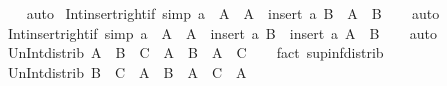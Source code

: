 \begin{isabellebody}
%
\isadelimproof
\ \ %
\endisadelimproof
%
\isatagproof
{}\isamarkupfalse%
\ auto%
\endisatagproof
{\isafoldproof}%
%
\isadelimproof
\isanewline
%
\endisadelimproof
\isanewline
{}\isamarkupfalse%
\ Int{\isacharunderscore}{\kern0pt}insert{\isacharunderscore}{\kern0pt}right{\isacharunderscore}{\kern0pt}if{}\ {\isacharbrackleft}{\kern0pt}simp{\isacharbrackright}{\kern0pt}{\isacharcolon}{\kern0pt}\ {\isachardoublequoteopen}a\ {\isasymnotin}\ A\ {\isasymLongrightarrow}\ A\ {\isasyminter}\ {\isacharparenleft}{\kern0pt}insert\ a\ B{\isacharparenright}{\kern0pt}\ {\isacharequal}{\kern0pt}\ A\ {\isasyminter}\ B{\isachardoublequoteclose}\isanewline
%
\isadelimproof
\ \ %
\endisadelimproof
%
\isatagproof
{}\isamarkupfalse%
\ auto%
\endisatagproof
{\isafoldproof}%
%
\isadelimproof
\isanewline
%
\endisadelimproof
\isanewline
{}\isamarkupfalse%
\ Int{\isacharunderscore}{\kern0pt}insert{\isacharunderscore}{\kern0pt}right{\isacharunderscore}{\kern0pt}if{}\ {\isacharbrackleft}{\kern0pt}simp{\isacharbrackright}{\kern0pt}{\isacharcolon}{\kern0pt}\ {\isachardoublequoteopen}a\ {\isasymin}\ A\ {\isasymLongrightarrow}\ A\ {\isasyminter}\ {\isacharparenleft}{\kern0pt}insert\ a\ B{\isacharparenright}{\kern0pt}\ {\isacharequal}{\kern0pt}\ insert\ a\ {\isacharparenleft}{\kern0pt}A\ {\isasyminter}\ B{\isacharparenright}{\kern0pt}{\isachardoublequoteclose}\isanewline
%
\isadelimproof
\ \ %
\endisadelimproof
%
\isatagproof
{}\isamarkupfalse%
\ auto%
\endisatagproof
{\isafoldproof}%
%
\isadelimproof
\isanewline
%
\endisadelimproof
\isanewline
{}\isamarkupfalse%
\ Un{\isacharunderscore}{\kern0pt}Int{\isacharunderscore}{\kern0pt}distrib{\isacharcolon}{\kern0pt}\ {\isachardoublequoteopen}A\ {\isasymunion}\ {\isacharparenleft}{\kern0pt}B\ {\isasyminter}\ C{\isacharparenright}{\kern0pt}\ {\isacharequal}{\kern0pt}\ {\isacharparenleft}{\kern0pt}A\ {\isasymunion}\ B{\isacharparenright}{\kern0pt}\ {\isasyminter}\ {\isacharparenleft}{\kern0pt}A\ {\isasymunion}\ C{\isacharparenright}{\kern0pt}{\isachardoublequoteclose}\isanewline
%
\isadelimproof
\ \ %
\endisadelimproof
%
\isatagproof
{}\isamarkupfalse%
\ {\isacharparenleft}{\kern0pt}fact\ sup{\isacharunderscore}{\kern0pt}inf{\isacharunderscore}{\kern0pt}distrib{}{\isacharparenright}{\kern0pt}%
\endisatagproof
{\isafoldproof}%
%
\isadelimproof
\isanewline
%
\endisadelimproof
\isanewline
{}\isamarkupfalse%
\ Un{\isacharunderscore}{\kern0pt}Int{\isacharunderscore}{\kern0pt}distrib{}{\isacharcolon}{\kern0pt}\ {\isachardoublequoteopen}{\isacharparenleft}{\kern0pt}B\ {\isasyminter}\ C{\isacharparenright}{\kern0pt}\ {\isasymunion}\ A\ {\isacharequal}{\kern0pt}\ {\isacharparenleft}{\kern0pt}B\ {\isasymunion}\ A{\isacharparenright}{\kern0pt}\ {\isasyminter}\ {\isacharparenleft}{\kern0pt}C\ {\isasymunion}\ A{\isacharparenright}{\kern0pt}{\isachardoublequoteclose}\isanewline

\end{isabellebody}

